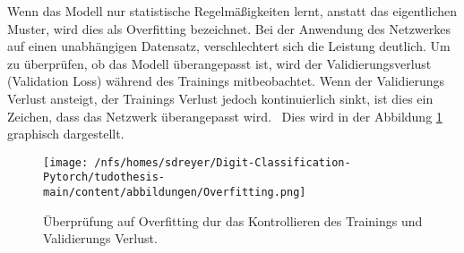 Wenn das Modell nur statistische Regelmäßigkeiten lernt, anstatt das eigentlichen Muster, wird dies als Overfitting bezeichnet.
Bei der Anwendung des Netzwerkes auf einen unabhängigen Datensatz, verschlechtert sich die Leistung deutlich. 
Um zu überprüfen, ob das Modell überangepasst ist, wird der Validierungsverlust (Validation Loss) während des Trainings mitbeobachtet.
Wenn der Validierungs Verlust ansteigt, der Trainings Verlust jedoch kontinuierlich sinkt, ist dies ein Zeichen, dass das Netzwerk überangepasst wird.~\cite{Yamashita2018}
Dies wird in der Abbildung \ref{fig:overfitting} graphisch dargestellt.
\begin{figure}[htbp]
  \centering
  \texttt{[image: /nfs/homes/sdreyer/Digit-Classification-Pytorch/tudothesis-main/content/abbildungen/Overfitting.png]}
  \caption{Überprüfung auf Overfitting dur das Kontrollieren des Trainings und Validierungs Verlust.~\cite{Yamashita2018}}
  \label{fig:overfitting}
\end{figure}
